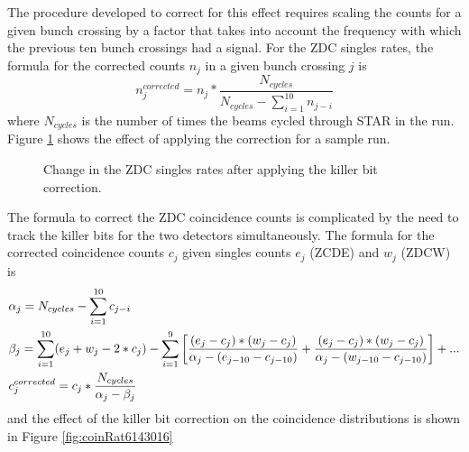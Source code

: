 The procedure developed to correct for this effect requires scaling the counts for a given bunch crossing by a factor that takes into account the frequency with which the previous ten bunch crossings had a signal.  For the ZDC singles rates, the formula for the corrected counts $n_{j}$ in a given bunch crossing $j$ is
%
\begin{equation}
  n_{j}^{corrected} = n_{j} * \frac{N_{cycles}}{N_{cycles} - \sum_{i=1}^{10}n_{j-i}}
\end{equation}
%
where $N_{cycles}$ is the number of times the beams cycled through STAR in the run.  Figure \ref{fig:zdc-singles-ratio} shows the effect of applying the correction for a sample run.

\begin{figure}
  \caption{Change in the ZDC singles rates after applying the killer bit correction.}
  \label{fig:zdc-singles-ratio}
\end{figure}

The formula to correct the ZDC coincidence counts is complicated by the need to track the killer bits for the two detectors simultaneously.  The formula for the corrected coincidence counts $c_{j}$ given singles counts $e_{j}$ (ZCDE) and $w_{j}$ (ZDCW) is
%
\begin{align}
  &\alpha_{j} = N_{cycles} - \sum_{i=1}^{10}c_{j-i} \notag\\
  &\beta_{j} = \sum_{i=1}^{10}(e_{j} + w_{j} - 2*c_{j}) - \sum_{i=1}^{9}\left[\frac{(e_{j}-c_{j}) * (w_{j}-c_{j})}{\alpha_{j}-(e_{j-10}-c_{j-10})} + \frac{(e_{j}-c_{j}) * (w_{j}-c_{j})}{\alpha_{j}-(w_{j-10}-c_{j-10})}\right] + ... \notag\\
  &c_{j}^{corrected} = c_{j} * \frac{N_{cycles}}{\alpha_{j} - \beta_{j}} 
\end{align}
%
and the effect of the killer bit correction on the coincidence distributions is shown in Figure \ref{fig:coinRat6143016}

